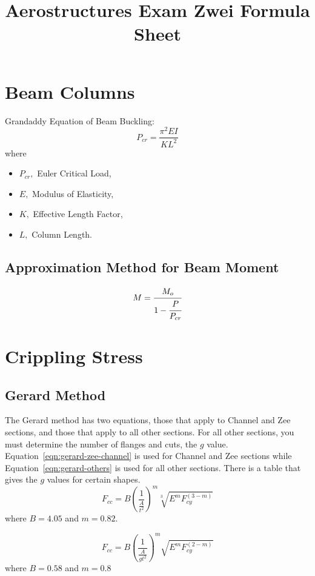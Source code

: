 \documentclass{article}
\title{Aerostructures  Exam Zwei Formula Sheet}
\author{}
\date{}
\begin{document}
\maketitle
\section{Beam Columns}
Grandaddy Equation of Beam Buckling:
\begin{equation}\label{eqn:grandaddy}
P_{cr} = \frac{\pi ^ 2 EI}{KL^2}
\end{equation}
where
\begin{itemize}
    \item $P_{cr},$ Euler Critical Load,
    \item $E,$ Modulus of Elasticity,
    \item $K,$ Effective Length Factor,
    \item $L,$ Column Length.
\end{itemize}
\subsection{Approximation Method for Beam Moment}
\begin{equation}
    M = \cfrac{M_o}{1 - \cfrac{P}{P_{cr}}}
\end{equation}


\section{Crippling Stress}
\subsection{Gerard Method}
The Gerard method has two equations, those that apply to Channel and Zee sections, and those that apply to all other sections.
For all other sections, you must determine the number of flanges and cuts, the $g$ value.
Equation~\ref{eqn:gerard-zee-channel} is used for Channel and Zee sections while Equation~\ref{eqn:gerard-others} is used for all other sections.
There is a table that gives the $g$ values for certain shapes.
\begin{equation}\label{eqn:gerard-zee-channel}
    F_{cc} = B\left(\frac{1}{\frac{A}{t^2}}\right)^m\sqrt[3]{E^mF_{cy}^{(3-m)}}
\end{equation}
where $B = 4.05$ and $m=0.82$.

\begin{equation}\label{eqn:gerard-others}
   F_{cc} = B\left(\frac{1}{\frac{A}{gt^2}}\right)^m\sqrt{E^mF_{cy}^{(2-m)}}
\end{equation}
where $B = 0.58$ and $ m = 0.8$
\end{document}
